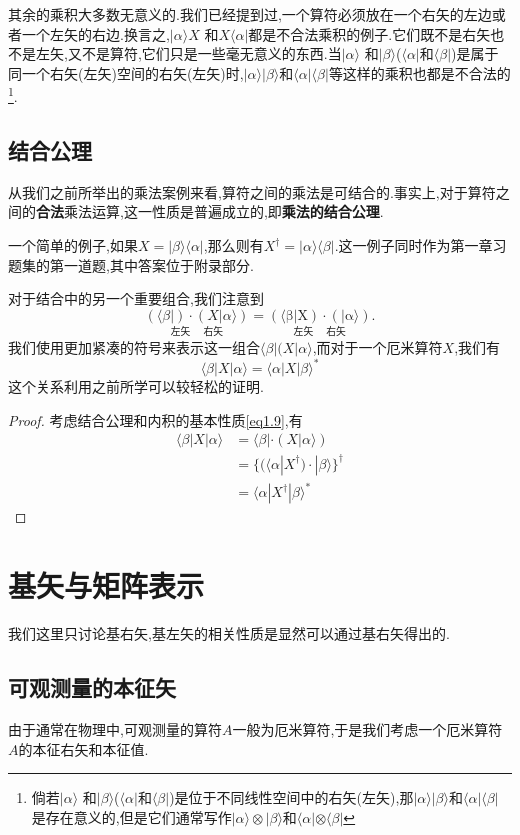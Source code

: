 \documentclass[lang=cn,newtx,10pt,scheme=chinese,thmcnt=section]{elegantbook}
\begin{document}
其余的乘积大多数无意义的.我们已经提到过,一个算符必须放在一个右矢的左边或者一个左矢的右边.换言之,$|\alpha\rangle X$ 和$X\langle\alpha|$都是不合法乘积的例子.它们既不是右矢也不是左矢,又不是算符,它们只是一些毫无意义的东西.当$|\alpha\rangle$ 和$|\beta\rangle$($\langle\alpha|$和$\langle\beta|$)是属于同一个右矢(左矢)空间的右矢(左矢)时,$|\alpha\rangle|\beta\rangle$和$\langle\alpha|\langle\beta|$等这样的乘积也都是不合法的\footnote{倘若$|\alpha\rangle$ 和$|\beta\rangle$($\langle\alpha|$和$\langle\beta|$)是位于不同线性空间中的右矢(左矢),那$|\alpha\rangle|\beta\rangle$和$\langle\alpha|\langle\beta|$是存在意义的,但是它们通常写作$|\alpha\rangle\otimes|\beta\rangle$和$\langle\alpha|\otimes\langle\beta|$}.
\subsection*{结合公理}
从我们之前所举出的乘法案例来看,算符之间的乘法是可结合的.事实上,对于算符之间的\textbf{合法}乘法运算,这一性质是普遍成立的,即\textbf{乘法的结合公理}.

一个简单的例子,如果$X=|\beta\rangle\langle\alpha|$,那么则有$X^\dagger=|\alpha\rangle\langle\beta|$.这一例子同时作为第一章习题集的第一道题,其中答案位于附录部分.

对于结合中的另一个重要组合,我们注意到
$$ \underset{\text{左矢}\quad\text{  右矢}}{(\langle\beta|)\cdot(X|\alpha\rangle)}=\underset{\text{左矢}\quad\text{ 右矢}}{\operatorname*{(\langle\beta|X)\cdot(|\alpha\rangle)}}.$$
我们使用更加紧凑的符号来表示这一组合$\langle\beta|(X|\alpha\rangle$,而对于一个厄米算符$X$,我们有
\begin{equation}
\langle\beta|X|\alpha\rangle=\langle\alpha|X|\beta\rangle^*
\end{equation}
这个关系利用之前所学可以较轻松的证明.
\begin{proof}
	考虑结合公理和内积的基本性质\ref{eq1.9},有
	$$
	\begin{aligned}
		\langle\beta|X|\alpha\rangle & =\langle\beta|\cdot(X|\alpha\rangle) \\
		&=\{(\langle\alpha| X^\dagger)\cdot|\beta\rangle\}^\dagger \\
		&=\langle\alpha| X^\dagger|\beta\rangle^*
	\end{aligned}
	$$
\end{proof}
\section{基矢与矩阵表示}
我们这里只讨论基右矢,基左矢的相关性质是显然可以通过基右矢得出的.
\subsection*{可观测量的本征矢}
由于通常在物理中,可观测量的算符$A$一般为厄米算符,于是我们考虑一个厄米算符$A$的本征右矢和本征值.
\end{document}
